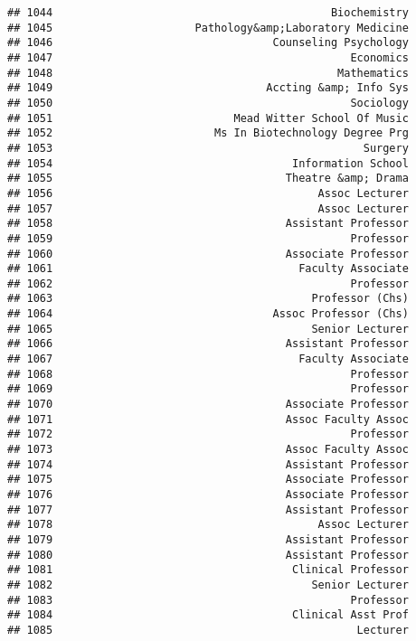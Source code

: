 \documentclass[
]{article}
\begin{document}
\begin{verbatim}
## 1044                                           Biochemistry
## 1045                      Pathology&amp;Laboratory Medicine
## 1046                                  Counseling Psychology
## 1047                                              Economics
## 1048                                            Mathematics
## 1049                                 Accting &amp; Info Sys
## 1050                                              Sociology
## 1051                            Mead Witter School Of Music
## 1052                         Ms In Biotechnology Degree Prg
## 1053                                                Surgery
## 1054                                     Information School
## 1055                                    Theatre &amp; Drama
## 1056                                         Assoc Lecturer
## 1057                                         Assoc Lecturer
## 1058                                    Assistant Professor
## 1059                                              Professor
## 1060                                    Associate Professor
## 1061                                      Faculty Associate
## 1062                                              Professor
## 1063                                        Professor (Chs)
## 1064                                  Assoc Professor (Chs)
## 1065                                        Senior Lecturer
## 1066                                    Assistant Professor
## 1067                                      Faculty Associate
## 1068                                              Professor
## 1069                                              Professor
## 1070                                    Associate Professor
## 1071                                    Assoc Faculty Assoc
## 1072                                              Professor
## 1073                                    Assoc Faculty Assoc
## 1074                                    Assistant Professor
## 1075                                    Associate Professor
## 1076                                    Associate Professor
## 1077                                    Assistant Professor
## 1078                                         Assoc Lecturer
## 1079                                    Assistant Professor
## 1080                                    Assistant Professor
## 1081                                     Clinical Professor
## 1082                                        Senior Lecturer
## 1083                                              Professor
## 1084                                     Clinical Asst Prof
## 1085                                               Lecturer

\end{verbatim}
\end{document}
